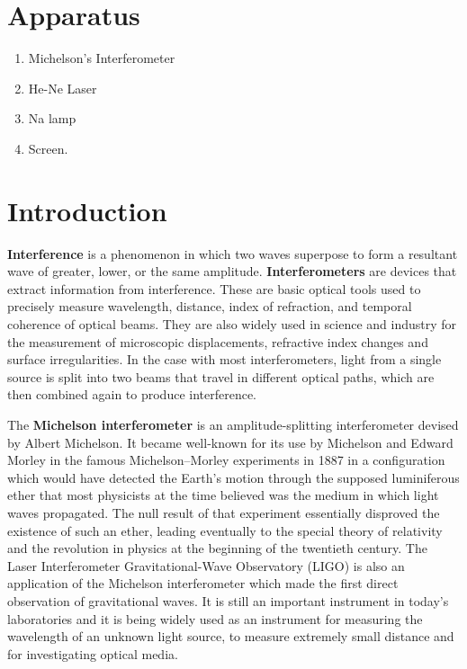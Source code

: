 \documentclass{article}
\begin{document}
\section{Apparatus}
\begin{enumerate}
    \item Michelson's Interferometer
    \item He-Ne Laser
    \item Na lamp
    \item Screen.
\end{enumerate}

\section{Introduction}
\noindent \textbf{Interference} is a phenomenon in which two waves superpose to form a resultant wave of greater, lower, or the same amplitude. \textbf{Interferometers} are devices that extract information from interference. These are basic optical tools used to precisely measure wavelength, distance, index of refraction, and temporal coherence of optical beams. They are also widely used in science and industry for the measurement of microscopic displacements, refractive index changes and surface irregularities. In the case with most interferometers, light from a single source is split into two beams that travel in different optical paths, which are then combined again to produce interference.
\par
\noindent
The \textbf{Michelson interferometer} is an amplitude-splitting interferometer devised by Albert Michelson. It became well-known for its use by Michelson and Edward Morley in the famous Michelson–Morley experiments in 1887 in a configuration which would have detected the Earth's motion through the supposed luminiferous ether that most physicists at the time believed was the medium in which light waves propagated. The null result of that experiment essentially disproved the existence of such an ether, leading eventually to the special theory of relativity and the revolution in physics at the beginning of the twentieth century. The Laser Interferometer Gravitational-Wave Observatory (LIGO) is also an application of the Michelson interferometer which made the first direct observation of gravitational waves. It is still an important instrument in today's laboratories and it is being widely used as an instrument for measuring the wavelength of an unknown light source, to measure extremely small distance and for investigating optical media.
\end{document}
